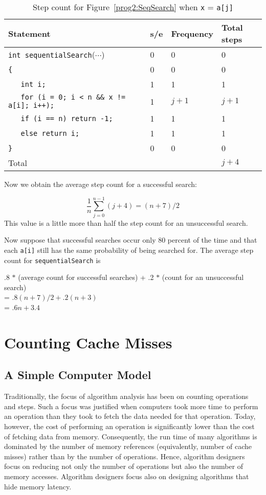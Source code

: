 \begin{example}
\begin{table}
\begin{tabular}{|l|lll|}
Statement & s/e & Frequency & Total steps\\ \hline
\verb?int sequentialSearch?($\cdots$) & 0 &0 & 0 \\
\verb?{? & 0 &0 & 0 \\
\verb?   int i;? & 1 &1 & 1 \\
\verb?   for (i = 0; i < n && x != a[i]; i++);? & 1 &$j+1$ & $j+1$ \\
\verb?   if (i == n) return -1;? & 1 &1 & 1 \\
\verb?   else return i;? & 1 &1 & 1 \\
\verb?}? & 0 &0 & 0 \\ \hline
Total &  &  & $  j + 4$\\
\end{tabular}
\caption{\label{fig2:SeqTab2}Step count for Figure~\ref{prog2:SeqSearch} when {\tt x} = {\tt a[j]}}
\end{table}

 
Now we obtain the average step count for a successful search:

\[ \frac{1}{ n}  \sum_{j = 0}^{n - 1} (j + 4) = (n + 7) / 2\]
This value is a little more than half the step count for an unsuccessful search.
 
Now suppose that successful searches occur only 80 percent of the time and that
each {\tt a[i]} still has the same probability of being searched for.
The average step count for {\tt sequentialSearch} is

\noindent
.8 $*$ (average count for successful searches) + .2 $*$ (count for an unsuccessful search)\\
\noindent
= $.8(n+7) / 2 + .2(n+3)$\\
\noindent
= $.6n + 3.4$
\end{example}
 

\section{Counting Cache Misses}
\subsection{A Simple Computer Model}
Traditionally,
the focus of algorithm analysis has been on
counting operations and steps.
Such a focus was justified when computers
took more time to perform an operation than they took to fetch the
data needed for that operation.  Today, however, the cost of performing
an operation is significantly lower than the cost of fetching data from memory.
Consequently, the run time of many algorithms is dominated by
the number of memory references (equivalently, number of cache misses) rather
than by the number of operations. Hence, algorithm designers focus on reducing
not only the number of operations but also the number of memory accesses.
Algorithm designers focus also on designing algorithms that hide memory
latency.

